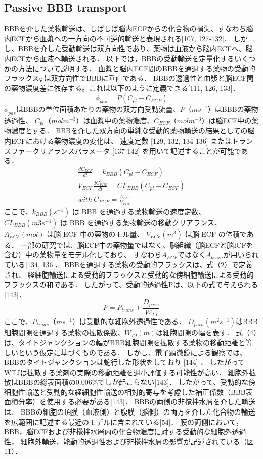 \documentclass[11pt,a4paper]{jsarticle}
\begin{document}
\subsection{Passive BBB transport}
BBBを介した薬物輸送は、しばしば脳内ECFからの化合物の損失、すなわち脳内ECFから血漿への一方向の不可逆的輸送と表現される[107, 127-132]．
しかし、BBBを介した受動輸送は双方向性であり、薬物は血液から脳内ECFへ、脳内ECFから血液へ輸送される．
以下では，BBBの受動輸送を定量化するいくつかの方法について説明する．
血漿と脳内ECF間のBBBを通過する薬物の受動的フラックス$φ$は双方向性でBBBに垂直である．
BBBの透過性と血漿と脳ECF間の薬物濃度差に依存する。これは以下のように定義できる[111, 126, 133]．
\begin{equation}
    \phi_{pas}=P(C_{pl}-C_{ECF})
\end{equation}
$\phi_{pas}$はBBBの単位面積あたりの薬物の双方向受動流量、$P（m s^{-1}）$はBBBの薬物透過性、
$C_{pl}（mol m^{-3}）$は血漿中の薬物濃度、$C_{ECF}（mol m^{-3}）$は脳ECF中の薬物濃度とする．
BBBを介した双方向の単純な受動的薬物輸送の結果としての脳内ECFにおける薬物濃度の変化は、
速度定数 [129, 132, 134-136] またはトランスファークリアランスパラメータ [137-142] を用いて記述することが可能である．
\begin{align*}
    \frac{dC_{ECF}}{dt}=k_{BBB}(C_{pl}-C_{ECF})\\
    V_{ECF}\frac{dC_{ECF}}{dt}=CL_{BBB}(C_{pl}-C_{ECF})\\
    with\ C_{ECF}=\frac{A_{ECF}}{V_{ECF}}
\end{align*}
ここで、$k_{BBB} (s^{-1})$ は BBB を通過する薬物輸送の速度定数、
$CL_{BBB} (m3 s^{-1})$ は BBB を通過する薬物輸送の移動クリアランス、
$A_{ECF} (mol)$ は脳 ECF 中の薬物のモル量、
$V_{ECF} (m^3)$ は脳 ECF の体積である．
一部の研究では、脳ECF中の薬物量ではなく、脳組織（脳ECFと脳ICFを含む）中の薬物量をモデル化しており、
すなわち$A_{ECF}$ではなく$A_{brain}$が用いられている[134, 136]．
BBBを通過する薬物の受動的フラックスは、式（2）で定義され、
経細胞輸送による受動的フラックスと受動的な傍細胞輸送による受動的フラックスの和である．
したがって、受動的透過性Pは、以下の式で与えられる[143]．
\begin{equation}
    P=P_{trans}+\frac{D_{para}}{W_{TJ}}
\end{equation}
ここで、$P_{trans}（m s^{-1}）$は受動的な細胞外透過性である．
$D_{para}(m^2 s^{-1})$はBBB細胞間隙を通過する薬物の拡散係数、$W_{TJ}(m)$は細胞間隙の幅を表す．
式（4）は、タイトジャンクションの幅がBBB細胞間隙を拡散する薬物の移動距離と等しいという仮定に基づくものである．
しかし、電子顕微鏡による観察では、BBBのタイトジャンクションは蛇行した形状をしており [144] 、
したがってWTJは拡散する薬剤の実際の移動距離を過小評価する可能性が高い．
細胞外拡散はBBBの総表面積の0.006\%でしか起こらない[143]．
したがって、受動的な傍細胞性輸送と受動的な経細胞性輸送の相対的寄与を考慮した補正係数（BBB表面積分率）を使用する必要がある[143]．
BBBの両側の非撹拌水層を介した輸送は、
BBBの細胞の頂膜（血液側）と腹膜（脳側）の両方を介した化合物の輸送を広範囲に記述する最近のモデルに含まれている[54]．
膜の両側において，BBB，脳ECFおよび非攪拌水層内の化合物濃度に対する受動的な細胞外透過性，
細胞外輸送，能動的透過性および非攪拌水層の影響が記述されている（図11）．
\end{document}
